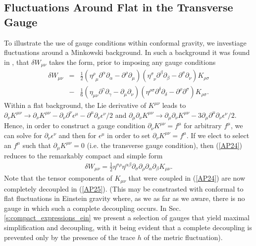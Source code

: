 \subsection{Fluctuations Around Flat in the Transverse Gauge}
\label{ss:fluctuations_around_flat_in_the_tranverse_gauge}
To illustrate the use of gauge conditions within conformal gravity, we investiage fluctuations around a Minkowski background. In such a background it was found in \cite{mannheim_2006}, that $\delta W_{\mu\nu}$ takes the form, prior to imposing any gauge conditions
%
\begin{eqnarray}
\delta W_{\mu\nu}&=&\frac{1}{2}(\eta^{\rho}_{\phantom{\rho} \mu} \partial^{\alpha}\partial_{\alpha}-\partial^{\rho}\partial_{\mu})
(\eta^{\sigma}_{\phantom{\sigma} \nu} \partial^{\beta}\partial_{\beta}-
\partial^{\sigma}\partial_{\nu})K_{\rho \sigma}
\nonumber\\
&-& 
\frac{1}{6}(\eta_{\mu \nu} \partial^{\gamma}\partial_{\gamma}-
\partial_{\mu}\partial_{\nu})(\eta^{\rho \sigma} \partial^{\delta}\partial_{\delta}-
\partial^{\rho}\partial^{\sigma})K_{\rho\sigma}.
\label{AP24}
\end{eqnarray}
%
Within a flat background, the Lie derivative of $K^{\mu\nu}$ leads to $\partial_{\nu}K^{\mu\nu}\rightarrow \partial_{\nu}K^{\mu\nu}-\partial_{\nu}\partial^{\nu}\epsilon^{\mu}-\partial^{\mu}\partial_{\nu}\epsilon^{\nu}/2$ and $\partial_{\mu}\partial_{\nu}K^{\mu\nu}\rightarrow \partial_{\mu}\partial_{\nu}K^{\mu\nu}-3\partial_{\mu}\partial^{\mu}\partial_{\nu}\epsilon^{\nu}/2$. Hence, in order to construct a gauge condition $\partial_{\nu}K^{\mu\nu} = f^\mu$ for arbitrary $f^\mu$, we can solve for $\partial_{\nu}\epsilon^{\nu}$ and then for $\epsilon^{\mu}$ in order to set $\partial_{\nu}K^{\mu\nu}=f^\mu$. If we elect to select an $f^\mu$ such that $\partial_{\mu}K^{\mu\nu}=0$ (i.e. the transverse gauge condition), then (\ref{AP24}) reduces to the remarkably compact and simple form
%
\begin{eqnarray}
\delta W_{\mu\nu}=\frac{1}{2}\eta^{\sigma\rho}\eta^{\alpha\beta}\partial_{\sigma}\partial_{\rho} \partial_{\alpha}\partial_{\beta}K_{\mu \nu}.
\label{AP25}
\end{eqnarray}
%
Note that the tensor components of $K_{\mu\nu}$ that were coupled in (\ref{AP24}) are now completely decoupled in (\ref{AP25}). (This may be constrasted with conformal to flat fluctuations in Einstein gravity where, as we as far as we aware, there is no gauge in which such a complete decoupling occurs. In Sec. \ref{s:compact_expressions_ein} we present a selection of gauges that yield maximal simplification and decoupling, with it being evident that a complete decoupling is prevented only by the presence of the trace $h$ of the metric fluctuation).

